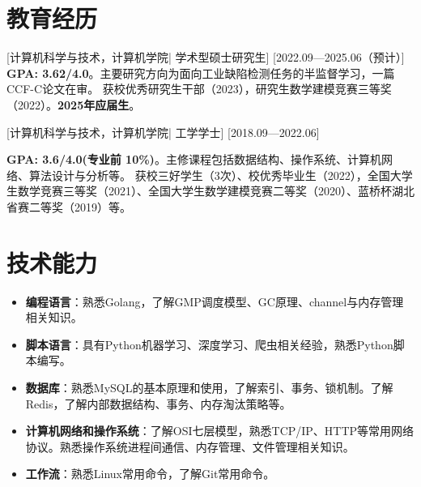 \documentclass{resume}
\begin{document}


\ResumeTitle


\section{教育经历}
[\textnormal{计算机科学与技术，计算机学院|}  学术型硕士研究生]
[2022.09—2025.06（预计）]
\textbf{GPA: 3.62/4.0}。主要研究方向为面向工业缺陷检测任务的半监督学习，一篇CCF-C论文在审。\newline
获校优秀研究生干部（2023），研究生数学建模竞赛三等奖（2022）。\textbf{2025年应届生}。

[\textnormal{计算机科学与技术，计算机学院|} 工学学士]
[2018.09—2022.06]

\textbf{GPA: 3.6/4.0(专业前 10\%)}。主修课程包括数据结构、操作系统、计算机网络、算法设计与分析等。\newline
获校三好学生（3次）、校优秀毕业生（2022），全国大学生数学竞赛三等奖（2021）、全国大学生数学建模竞赛二等奖（2020）、蓝桥杯湖北省赛二等奖（2019）等。

\section[技术能力]{技术能力}
\begin{itemize}
  \item \textbf{编程语言}：熟悉Golang，了解GMP调度模型、GC原理、channel与内存管理相关知识。
  \item \textbf{脚本语言}：具有Python机器学习、深度学习、爬虫相关经验，熟悉Python脚本编写。
  \item \textbf{数据库}：熟悉MySQL的基本原理和使用，了解索引、事务、锁机制。了解Redis，了解内部数据结构、事务、内存淘汰策略等。
  \item \textbf{计算机网络和操作系统}：了解OSI七层模型，熟悉TCP/IP、HTTP等常用网络协议。熟悉操作系统进程间通信、内存管理、文件管理相关知识。
  \item \textbf{工作流}：熟悉Linux常用命令，了解Git常用命令。
\end{itemize}
\end{document}
